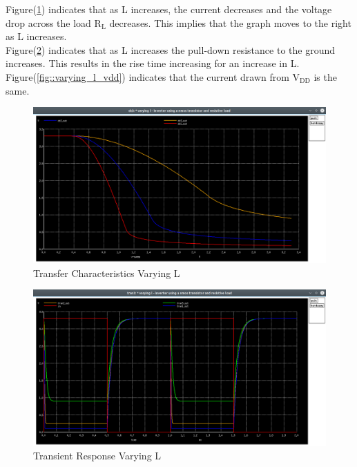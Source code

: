 \documentclass[12pt]{article}
\begin{document}
	
	Figure(\ref{fig::varying_l_dc}) indicates that as L increases, the current decreases and the voltage drop across the load $\text{R}_\text{L}$ decreases. This implies that the graph moves to the right as L increases.\\
    Figure(\ref{fig::varying_l_time}) indicates that as L increases the pull-down resistance to the ground increases. This results in the rise time increasing for an increase in L.\\
    Figure(\ref{fig::varying_l_vdd}) indicates that the current drawn from $\text{V}_{\text{DD}}$ is the same.
    \begin{figure}[H]
		\begin{center}
			\includegraphics[scale=0.25]{images/inverter_l_dc.png}
			\caption{Transfer Characteristics Varying L}
			\label{fig::varying_l_dc}
		\end{center}
	\end{figure}
	\begin{figure}[H]
		\begin{center}
			\includegraphics[scale=0.25]{images/inverter_l_tran.png}
			\caption{Transient Response Varying L}
			\label{fig::varying_l_time}
		\end{center}
	\end{figure}
	
\end{document}
